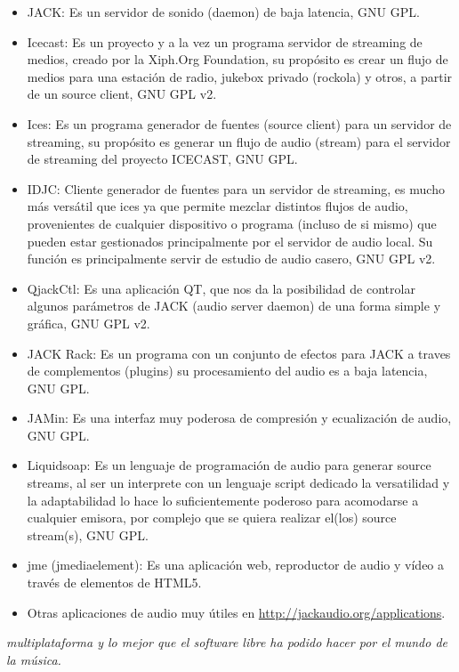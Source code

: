 \begin{multicols}{2}
\begin{itemize}
\item JACK: Es un servidor de sonido (daemon) de baja latencia, GNU GPL.
\item Icecast: Es un proyecto y a la vez un programa servidor de streaming de medios, creado por la Xiph.Org Foundation, su propósito es crear un flujo de medios para una estación de radio, jukebox privado (rockola) y otros, a partir de un source client, GNU GPL v2.
\item Ices: Es un programa generador de fuentes (source client) para un servidor de streaming, su propósito es generar un flujo de audio (stream) para el servidor de streaming del proyecto ICECAST, GNU GPL.
\item IDJC: Cliente generador de fuentes para un servidor de streaming, es mucho más versátil que ices ya que permite mezclar distintos flujos de audio, provenientes de cualquier dispositivo o programa (incluso de si mismo) que pueden estar gestionados principalmente por el servidor de audio local. Su función es principalmente servir de estudio de audio casero, GNU GPL v2.
\item QjackCtl: Es una aplicación QT, que nos da la posibilidad de controlar algunos parámetros de JACK (audio server daemon) de una forma simple y gráfica, GNU GPL v2.
\item JACK Rack: Es un programa con un conjunto de efectos para JACK a traves de complementos (plugins) su procesamiento del audio es a baja latencia, GNU GPL.
\item JAMin: Es una interfaz muy poderosa de compresión y ecualización de audio, GNU GPL.
\item Liquidsoap:  Es un lenguaje de programación de audio para generar source streams, al ser un interprete con un lenguaje script dedicado la versatilidad y la adaptabilidad lo hace lo suficientemente poderoso para acomodarse a cualquier emisora, por complejo que se quiera realizar el(los) source stream(s), GNU GPL.
\item jme (jmediaelement): Es una aplicación web, reproductor de audio y vídeo a través de elementos de HTML5.
\item Otras aplicaciones de audio muy útiles en  \url{http://jackaudio.org/applications}.
\end{itemize}

\begin{entradilla} %
{\em {\color{introcolor}{Jack Audio Connection Kit}} multiplataforma y lo mejor que el software libre ha podido hacer por el mundo de la música.}
\end{entradilla}



\end{multicols}
